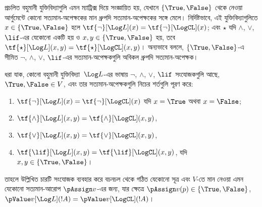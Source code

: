 \documentclass[../../../include/open-logic-section]{subfiles}
\begin{document}


প্রচলিত বহুমানী যুক্তিবিদ্যাগুলি এমন ম্যাট্রিক্স দিয়ে সংজ্ঞায়িত হয়,
যেখানে $\{\True, \False\}$ থেকে নেওয়া আর্গুমেন্টে কোনো
সত্যমান-অপেক্ষকের মান ধ্রুপদি সত্যমান-অপেক্ষকের সঙ্গে মেলে। নির্দিষ্টভাবে,
এই যুক্তিবিদ্যাগুলিতে $x \in \{\True, \False\}$ হলে
$\tf{\lnot}[\Log L](x) = \tf{\lnot}[\LogCL](x)$; এবং $\star$ যদি
$\land$, $\lor$, $\lif$-এর যেকোনো একটি হয় ও $x, y \in \{\True,
\False\}$ হয়, তবে $\tf{\star}[\Log L](x,y) =
\tf{\star}[\LogCL](x,y)$। অন্যভাবে বললে, $\{\True,\False\}$-এ সীমিত
$\lnot$, $\land$, $\lor$, $\lif$-এর সত্যমান-অপেক্ষকগুলি অবিকল ধ্রুপদি
সত্যমান-অপেক্ষক।

\begin{prop}
  ধরা যাক, কোনো বহুমানী যুক্তিবিদ্যা~$\Log L$-এর ভাষায়
  $\lnot$, $\land$, $\lor$, $\lif$ সংযোজকগুলি আছে, $\True, \False \in
  V$, এবং তার সত্যমান-অপেক্ষকগুলি নিচের শর্তগুলি পূরণ করে:
  \begin{enumerate}
    \item{} $\tf{\lnot}[\Log L](x) = \tf{\lnot}[\LogCL](x)$ যদি $x =
    \True$ অথবা $x = \False$;
    \item{} $\tf{\land}[\Log L](x,y) = \tf{\land}[\LogCL](x,y)$,
    \item{} $\tf{\lor}[\Log L](x,y) = \tf{\lor}[\LogCL](x,y)$,
    \item{} $\tf{\lif}[\Log L](x,y) = \tf{\lif}[\LogCL](x,y)$,
    যদি $x, y \in \{\True, \False\}$।
  \end{enumerate}
  তাহলে উল্লিখিত চারটি সংযোজক ব্যবহার করে বচনচল থেকে গঠিত যেকোনো
  সূত্র এবং $V$-তে মান নেওয়া এমন যেকোনো সত্যমান-আরোপ
  $\pAssign v$-এর জন্য, যার ক্ষেত্রে $\pAssign
  v(p) \in \{\True,\False\}$, $\pValue v[\Log L](!A) = \pValue
  v[\LogCL](!A)$।
\end{prop}
\end{document}
